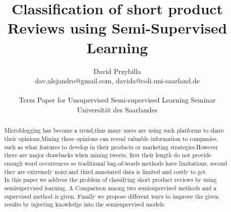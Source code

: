 \documentclass[4pt,a4paper,twocolumn]{article}
\author{David Przybilla\\dav.alejandro@gmail.com, davida@coli.uni-saarland.de\\ \\ Term Paper for Unsupervised Semi-supervised
Learning Seminar\\ Universit\"{a}t des Saarlandes}
\title{Classification of short product Reviews using Semi-Supervised Learning}
\begin{document}
\twocolumn[
	 \begin{@twocolumnfalse}
    \maketitle
  \end{@twocolumnfalse}
 ]

   \begin{abstract}
      Microblogging has become a trend,thus many users are using such platforms to share their opinions.Mining these opinions can reveal valuable information to companies, such as what features to develop in their products or marketing strategies.However there are  major drawbacks when mining tweets, first their length do not provide enough word occurrences so traditional bag-of-words methods have limitations, second they are extremely noisy,and third annotated data is limited and costly to get.\\
      In this paper we address the problem of classifying short product reviews by using semisupervised learning. A Comparison among two semisupervised methods and a supervised method is given. Finally we propose different ways to improve the given results by injecting knowledge into the semisupervised models.
    \end{abstract}
\end{document}
